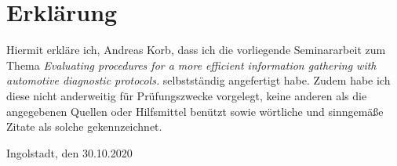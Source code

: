 \section*{Erklärung}
\thispagestyle{empty}
Hiermit erkläre ich, Andreas Korb, dass ich die vorliegende Seminararbeit zum Thema
\textit{Evaluating procedures for a more efficient information gathering with automotive diagnostic protocols.}
selbstständig angefertigt habe. Zudem habe ich diese nicht anderweitig für Prüfungszwecke
vorgelegt, keine anderen als die angegebenen Quellen oder Hilfsmittel benützt sowie wörtliche und sinngemäße Zitate als solche gekennzeichnet.
\vspace{3cm}

Ingolstadt, den 30.10.2020